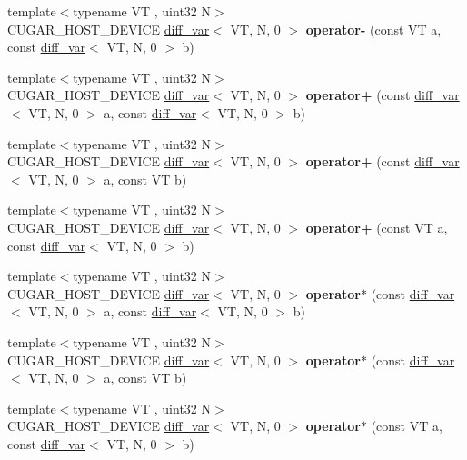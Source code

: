 \begin{DoxyCompactItemize}
\item 
{\footnotesize template$<$typename VT , uint32 N$>$ }\\C\+U\+G\+A\+R\+\_\+\+H\+O\+S\+T\+\_\+\+D\+E\+V\+I\+CE \hyperlink{structcugar_1_1diff__var}{diff\+\_\+var}$<$ VT, N, 0 $>$ {\bfseries operator-\/} (const VT a, const \hyperlink{structcugar_1_1diff__var}{diff\+\_\+var}$<$ VT, N, 0 $>$ b)
\item 
{\footnotesize template$<$typename VT , uint32 N$>$ }\\C\+U\+G\+A\+R\+\_\+\+H\+O\+S\+T\+\_\+\+D\+E\+V\+I\+CE \hyperlink{structcugar_1_1diff__var}{diff\+\_\+var}$<$ VT, N, 0 $>$ {\bfseries operator+} (const \hyperlink{structcugar_1_1diff__var}{diff\+\_\+var}$<$ VT, N, 0 $>$ a, const \hyperlink{structcugar_1_1diff__var}{diff\+\_\+var}$<$ VT, N, 0 $>$ b)
\item 
{\footnotesize template$<$typename VT , uint32 N$>$ }\\C\+U\+G\+A\+R\+\_\+\+H\+O\+S\+T\+\_\+\+D\+E\+V\+I\+CE \hyperlink{structcugar_1_1diff__var}{diff\+\_\+var}$<$ VT, N, 0 $>$ {\bfseries operator+} (const \hyperlink{structcugar_1_1diff__var}{diff\+\_\+var}$<$ VT, N, 0 $>$ a, const VT b)
\item 
{\footnotesize template$<$typename VT , uint32 N$>$ }\\C\+U\+G\+A\+R\+\_\+\+H\+O\+S\+T\+\_\+\+D\+E\+V\+I\+CE \hyperlink{structcugar_1_1diff__var}{diff\+\_\+var}$<$ VT, N, 0 $>$ {\bfseries operator+} (const VT a, const \hyperlink{structcugar_1_1diff__var}{diff\+\_\+var}$<$ VT, N, 0 $>$ b)
\item 
{\footnotesize template$<$typename VT , uint32 N$>$ }\\C\+U\+G\+A\+R\+\_\+\+H\+O\+S\+T\+\_\+\+D\+E\+V\+I\+CE \hyperlink{structcugar_1_1diff__var}{diff\+\_\+var}$<$ VT, N, 0 $>$ {\bfseries operator$\ast$} (const \hyperlink{structcugar_1_1diff__var}{diff\+\_\+var}$<$ VT, N, 0 $>$ a, const \hyperlink{structcugar_1_1diff__var}{diff\+\_\+var}$<$ VT, N, 0 $>$ b)
\item 
{\footnotesize template$<$typename VT , uint32 N$>$ }\\C\+U\+G\+A\+R\+\_\+\+H\+O\+S\+T\+\_\+\+D\+E\+V\+I\+CE \hyperlink{structcugar_1_1diff__var}{diff\+\_\+var}$<$ VT, N, 0 $>$ {\bfseries operator$\ast$} (const \hyperlink{structcugar_1_1diff__var}{diff\+\_\+var}$<$ VT, N, 0 $>$ a, const VT b)
\item 
{\footnotesize template$<$typename VT , uint32 N$>$ }\\C\+U\+G\+A\+R\+\_\+\+H\+O\+S\+T\+\_\+\+D\+E\+V\+I\+CE \hyperlink{structcugar_1_1diff__var}{diff\+\_\+var}$<$ VT, N, 0 $>$ {\bfseries operator$\ast$} (const VT a, const \hyperlink{structcugar_1_1diff__var}{diff\+\_\+var}$<$ VT, N, 0 $>$ b)

\end{DoxyCompactItemize}

